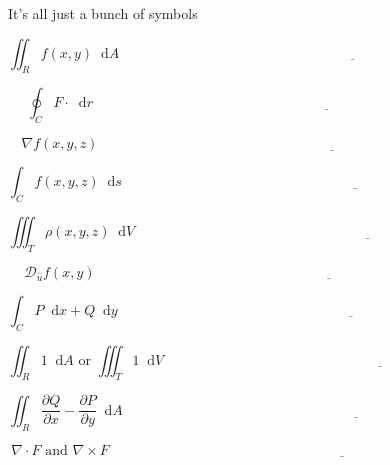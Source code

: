 \documentclass[11pt]{article}
\newcommand{\vs}{\vspace*{.1in}}
\newcommand*\dif{\mathop{}\!\mathrm{d}}
\begin{document}
\begin{huge}
    \begin{center}
       It's all just a bunch of symbols
    \end{center}
\end{huge}


\vs\vs

\[\iint_Rf(x,y)\dif{A} \hspace{2cm}\underline{\hspace{10cm}}\]

\[\oint_C F \cdot \dif{r}\hspace{2cm}\underline{\hspace{10cm}}\]


\[\nabla f(x,y,z)\hspace{2cm}\underline{\hspace{10cm}}\]

\[\int_C f(x,y,z) \dif{s}\hspace{2cm}\underline{\hspace{10cm}}\]


\[\iiint_T \rho(x,y,z) \dif{V}\hspace{2cm}\underline{\hspace{10cm}}\]

\[\mathcal{D}_{\hat{u}}f(x,y)\hspace{2cm}\underline{\hspace{10cm}}\]

\[\int_C P\dif{x}+Q\dif{y}\hspace{2cm}\underline{\hspace{10cm}}\]


\[\iint_R 1 \dif{A} \text{ or } \iiint_T 1 \dif{V}\hspace{2cm}\underline{\hspace{9cm}}\]

\[\iint_R \frac{\partial Q}{\partial x} - \frac{\partial P}{\partial y} \dif{A} \hspace{2cm}\underline{\hspace{10cm}}\]

\[\nabla \cdot F \text{ and } \nabla \times F \hspace{2cm}\underline{\hspace{10cm}}\]
\end{document}
